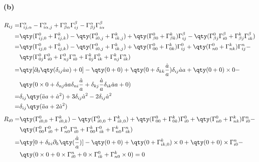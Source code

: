 \paragraph{(b)}
\begin{align*}
    R_{ij} =& \Gamma^\alpha_{ij, \alpha} - \Gamma^\alpha_{i\alpha, j} + \Gamma^\alpha_{\beta\alpha}\Gamma^\beta_{ij} - \Gamma^\alpha_{\beta j}\Gamma^\beta_{i \alpha} \\
        =&\qty(\Gamma^0_{ij, 0} + \Gamma^k_{ij, k}) - \qty(\Gamma^0_{i0, j} + \Gamma^k_{ik, j}) + \qty(\Gamma^0_{\beta 0} + \Gamma^k_{\beta k})\Gamma^\beta_{ij} - \qty(\Gamma^0_{\beta j}\Gamma^\beta_{i 0} + \Gamma^k_{\beta j}\Gamma^\beta_{i k})\\
        =&\qty(\Gamma^0_{ij, 0} + \Gamma^k_{ij, k}) - \qty(\Gamma^0_{i0, j} + \Gamma^k_{ik, j}) + \qty(\Gamma^0_{0 0} + \Gamma^k_{0 k})\Gamma^0_{ij} + \qty(\Gamma^0_{n 0} + \Gamma^k_{n k})\Gamma^n_{ij} - \\
         &\qty(\Gamma^0_{0 j}\Gamma^0_{i 0} + \Gamma^0_{n j}\Gamma^n_{i 0} + \Gamma^k_{0 j}\Gamma^0_{i k} + \Gamma^k_{n j}\Gamma^n_{i k})\\
        =&\qty[\partial_0\qty(\delta_{ij}\dot{a}a) + 0] - \qty(0+0) + \qty(0+\delta_{kk}\frac{\dot{a}}{a})\delta_{ij}\dot{a}a + \qty(0+0)\times 0 - \\
         &\qty(0\times0+\delta_{nj}\dot{a}a\delta_{ni}\frac{\dot{a}}{a} + \delta_{kj}\frac{\dot{a}}{a}\delta_{ik}\dot{a}a + 0)\\
        =&\delta_{ij} \qty(\ddot{a}a + \dot{a}^2) + 3\delta_{ij}\dot{a}^2 - 2\delta_{ij}\dot{a}^2\\
        =&\delta_{ij} \qty(\ddot{a}a + 2\dot{a}^2)
\end{align*}
\begin{align*}
    R_{i0} =&\qty(\Gamma^0_{i0, 0} + \Gamma^k_{i0, k}) - \qty(\Gamma^0_{i0, 0} + \Gamma^k_{ik, 0}) + \qty(\Gamma^0_{0 0} + \Gamma^k_{0 k})\Gamma^0_{i0} + \qty(\Gamma^0_{n 0} + \Gamma^k_{n k})\Gamma^n_{i0} - \\
        &\qty(\Gamma^0_{0 0}\Gamma^0_{i 0} + \Gamma^0_{n 0}\Gamma^n_{i 0} + \Gamma^k_{0 0}\Gamma^0_{i k} + \Gamma^k_{n 0}\Gamma^n_{i k})\\
        =& \qty[0+\delta_{ki}\partial_k\qty(\frac{\dot{a}}{a})] - \qty(0 + 0) + \qty(0 + \Gamma^k_{ik, 0}) \times 0 + \qty(0 + 0)\times\Gamma^n_{i0} - \\
        &\qty(0\times0 + 0 \times \Gamma^n_{i 0} + 0 \times \Gamma^0_{i k} + \Gamma^k_{n 0} \times 0)
        = 0
\end{align*}